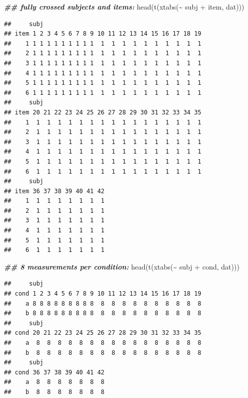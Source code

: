 \documentclass[
  12pt,
]{krantz}
\newenvironment{Shaded}{\begin{snugshade}}{\end{snugshade}}
\newcommand{\DocumentationTok}[1]{\textcolor[rgb]{0.56,0.35,0.01}{\textbf{\textit{#1}}}}
\newcommand{\FunctionTok}[1]{\textcolor[rgb]{0.00,0.00,0.00}{#1}}
\newcommand{\NormalTok}[1]{#1}
\newcommand{\SpecialCharTok}[1]{\textcolor[rgb]{0.00,0.00,0.00}{#1}}
\theoremstyle{definition}
\theoremstyle{definition}
\theoremstyle{definition}
\theoremstyle{definition}
\theoremstyle{remark}
\begin{document}
\begin{Shaded}
\begin{Highlighting}[]
\DocumentationTok{\#\# fully  crossed subjects and items:}
\FunctionTok{head}\NormalTok{(}\FunctionTok{t}\NormalTok{(}\FunctionTok{xtabs}\NormalTok{(}\SpecialCharTok{\textasciitilde{}}\NormalTok{ subj }\SpecialCharTok{+}\NormalTok{ item, dat)))}
\end{Highlighting}
\end{Shaded}

\begin{verbatim}
##     subj
## item 1 2 3 4 5 6 7 8 9 10 11 12 13 14 15 16 17 18 19
##    1 1 1 1 1 1 1 1 1 1  1  1  1  1  1  1  1  1  1  1
##    2 1 1 1 1 1 1 1 1 1  1  1  1  1  1  1  1  1  1  1
##    3 1 1 1 1 1 1 1 1 1  1  1  1  1  1  1  1  1  1  1
##    4 1 1 1 1 1 1 1 1 1  1  1  1  1  1  1  1  1  1  1
##    5 1 1 1 1 1 1 1 1 1  1  1  1  1  1  1  1  1  1  1
##    6 1 1 1 1 1 1 1 1 1  1  1  1  1  1  1  1  1  1  1
##     subj
## item 20 21 22 23 24 25 26 27 28 29 30 31 32 33 34 35
##    1  1  1  1  1  1  1  1  1  1  1  1  1  1  1  1  1
##    2  1  1  1  1  1  1  1  1  1  1  1  1  1  1  1  1
##    3  1  1  1  1  1  1  1  1  1  1  1  1  1  1  1  1
##    4  1  1  1  1  1  1  1  1  1  1  1  1  1  1  1  1
##    5  1  1  1  1  1  1  1  1  1  1  1  1  1  1  1  1
##    6  1  1  1  1  1  1  1  1  1  1  1  1  1  1  1  1
##     subj
## item 36 37 38 39 40 41 42
##    1  1  1  1  1  1  1  1
##    2  1  1  1  1  1  1  1
##    3  1  1  1  1  1  1  1
##    4  1  1  1  1  1  1  1
##    5  1  1  1  1  1  1  1
##    6  1  1  1  1  1  1  1
\end{verbatim}

\begin{Shaded}
\begin{Highlighting}[]
\DocumentationTok{\#\#  8 measurements per condition:}
\FunctionTok{head}\NormalTok{(}\FunctionTok{t}\NormalTok{(}\FunctionTok{xtabs}\NormalTok{(}\SpecialCharTok{\textasciitilde{}}\NormalTok{ subj }\SpecialCharTok{+}\NormalTok{ cond, dat)))}
\end{Highlighting}
\end{Shaded}

\begin{verbatim}
##     subj
## cond 1 2 3 4 5 6 7 8 9 10 11 12 13 14 15 16 17 18 19
##    a 8 8 8 8 8 8 8 8 8  8  8  8  8  8  8  8  8  8  8
##    b 8 8 8 8 8 8 8 8 8  8  8  8  8  8  8  8  8  8  8
##     subj
## cond 20 21 22 23 24 25 26 27 28 29 30 31 32 33 34 35
##    a  8  8  8  8  8  8  8  8  8  8  8  8  8  8  8  8
##    b  8  8  8  8  8  8  8  8  8  8  8  8  8  8  8  8
##     subj
## cond 36 37 38 39 40 41 42
##    a  8  8  8  8  8  8  8
##    b  8  8  8  8  8  8  8
\end{verbatim}
\end{document}
